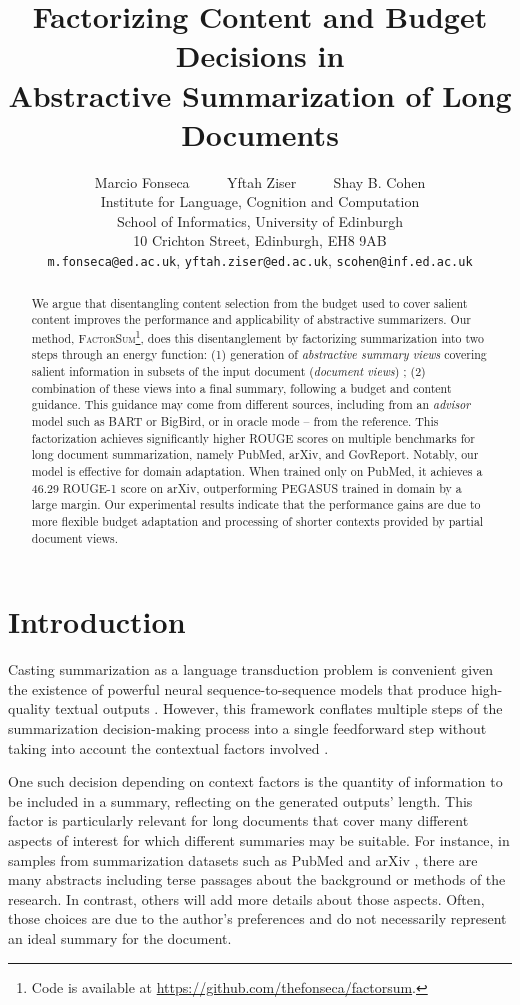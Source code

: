 \documentclass[11pt,table]{article}
\title{Factorizing Content and Budget Decisions in \\ Abstractive Summarization of Long Documents}
\author{Marcio Fonseca $\qquad$ Yftah Ziser $\qquad$ Shay B. Cohen \\
Institute for Language, Cognition and Computation \\
School of Informatics, University of Edinburgh \\
10 Crichton Street, Edinburgh, EH8 9AB \\
\medskip
\texttt{m.fonseca@ed.ac.uk},
\texttt{yftah.ziser@ed.ac.uk},
\texttt{scohen@inf.ed.ac.uk}}
\newcommand{\modelname}{FactorSum}
\begin{document}
\maketitle
\begin{abstract}
We argue that disentangling content selection from the budget used to cover salient content improves the performance and applicability of abstractive summarizers. Our method, \textsc{\modelname}\footnote{Code is available at \url{https://github.com/thefonseca/factorsum}.}, does this disentanglement by factorizing summarization into two steps through
an energy function: (1) generation of \emph{abstractive summary views} covering salient information in subsets of the input document (\emph{document views})
; (2) combination of these views into a final summary, following a budget and content guidance. This guidance may come from different sources, including from an \emph{advisor} model such as BART or BigBird, or in oracle mode -- from the reference. This factorization achieves significantly higher ROUGE scores on multiple benchmarks for long document summarization, namely PubMed, arXiv, and GovReport. Notably, our model is effective for domain adaptation. When trained only on PubMed, it achieves a 46.29 ROUGE-1 score on arXiv, outperforming PEGASUS trained in domain by a large margin. Our experimental results indicate that the performance gains are due to more flexible budget adaptation and processing of shorter contexts provided by partial document views.
\end{abstract}

\section{Introduction}

Casting summarization as a language transduction problem is convenient given the existence of powerful neural sequence-to-sequence models that produce high-quality textual outputs \citep{zhang2020pegasus,lewis2019bart}. However, this framework conflates multiple steps of the summarization decision-making process into a single feedforward step without taking into account the contextual factors involved \citep{jones1999automatic}.

One such decision depending on context factors is the quantity of information to be included in a summary, reflecting on the generated outputs' length. This factor is particularly relevant for long documents that cover many different aspects of interest for which different summaries may be suitable. For instance, in samples from summarization datasets such as PubMed and arXiv \citep{cohan2018discourse}, there are many abstracts including terse passages about the background or methods of the research. In contrast, others will add more details about those aspects. Often, those choices are due to the author's preferences and do not necessarily represent an ideal summary for the document.
\end{document}

